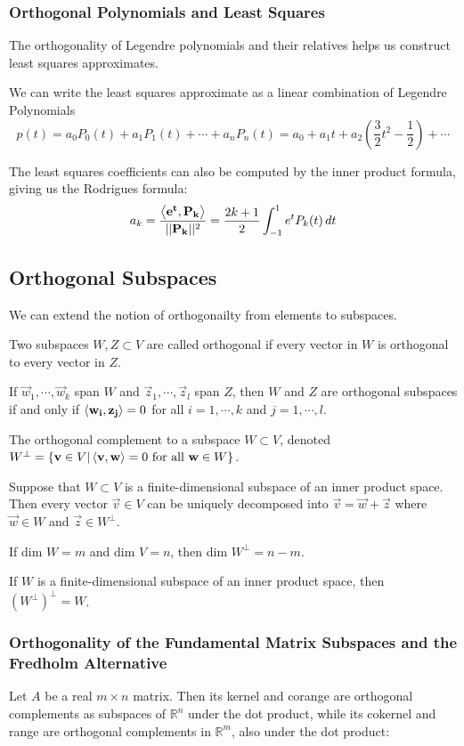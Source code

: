         \subsubsection{Orthogonal Polynomials and Least Squares}
        The orthogonality of Legendre polynomials and their relatives helps us construct least squares approximates.

        We can write the least squares approximate as a linear combination of Legendre Polynomials
            \[ p(t) = a_0 P_0(t) + a_1P_1(t) + \cdots + a_n P_n(t) = a_0 + a_1 t + a_2(\frac{3}{2} t^2 - \frac{1}{2}) + \cdots \]

        The least squares coefficients can also be computed by the inner product formula, giving us the Rodrigues formula:
            \[ a_k = \frac{\left\langle \mathbf{e^t}, \mathbf{P_k} \right\rangle}{\lvert \lvert \mathbf{P_k} \rvert \rvert^2} = \frac{2k + 1}{2} \int^1_{-1} e^t P_k(t) \, dt \]

    \subsection{Orthogonal Subspaces}
    We can extend the notion of orthogonailty from elements to subspaces.

    Two subspaces $W,Z \subset V$ are called orthogonal if every vector in $W$ is orthogonal to every vector in $Z$.

    If $\vec{w}_1, \cdots, \vec{w}_k$ span $W$ and $\vec{z}_1, \cdots, \vec{z}_l$ span $Z$, then $W$ and $Z$ are orthogonal subspaces if and only if $\left\langle \mathbf{w_i}, \mathbf{z_j} \right\rangle = 0$ for all $i = 1, \cdots, k$ and $j = 1, \cdots, l$.

    The orthogonal complement to a subspace $W \subset V$, denoted $W^\bot = \{ \mathbf{v} \in V | \left\langle \mathbf{v}, \mathbf{w} \right\rangle = 0 \text{ for all } \mathbf{w} \in W \}$.

    Suppose that $W \subset V$ is a finite-dimensional subspace of an inner product space. Then every vector $\vec{v} \in V$ can be uniquely decomposed into $\vec{v} = \vec{w} + \vec{z}$ where $\vec{w} \in W$ and $\vec{z} \in W^\bot$.

    If dim $W = m$ and dim $V = n$, then dim $W^\bot = n - m$.

    If $W$ is a finite-dimensional subspace of an inner product space, then ${(W^\bot)}^\bot = W$.

        \subsubsection{Orthogonality of the Fundamental Matrix Subspaces and the Fredholm Alternative}
        Let $A$ be a real $m \times n$ matrix. Then its kernel and corange are orthogonal complements as subspaces of $\mathbb{R}^n$ under the dot product, while its cokernel and range are orthogonal complements in $\mathbb{R}^m$, also under the dot product:

